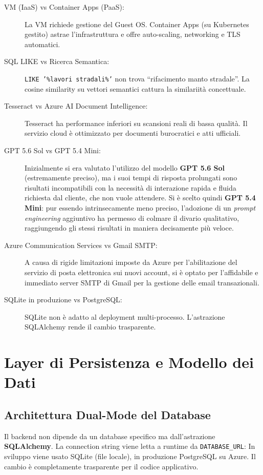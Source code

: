 \documentclass[12pt,a4paper,oneside]{report}
\begin{document}
\begin{description}
    \item[VM (IaaS) vs Container Apps (PaaS):] La VM richiede gestione del Guest OS.
        Container Apps (su Kubernetes gestito) astrae l'infrastruttura e offre
        auto-scaling, networking e TLS automatici.
    \item[SQL LIKE vs Ricerca Semantica:] \texttt{LIKE '\%lavori stradali\%'} non trova
        ``rifacimento manto stradale''. La cosine similarity su vettori semantici
        cattura la similariit\`{a} concettuale.
    \item[Tesseract vs Azure AI Document Intelligence:] Tesseract ha performance
        inferiori su scansioni reali di bassa qualit\`{a}. Il servizio cloud \`{e}
        ottimizzato per documenti burocratici e atti ufficiali.
    \item[GPT 5.6 Sol vs GPT 5.4 Mini:] Inizialmente si era valutato l'utilizzo del modello \textbf{GPT 5.6 Sol} (estremamente preciso), ma i suoi tempi di risposta prolungati sono risultati incompatibili con la necessit\`{a} di interazione rapida e fluida richiesta dal cliente, che non vuole attendere. Si \`{e} scelto quindi \textbf{GPT 5.4 Mini}: pur essendo intrinsecamente meno preciso, l'adozione di un \textit{prompt engineering} aggiuntivo ha permesso di colmare il divario qualitativo, raggiungendo gli stessi risultati in maniera decisamente pi\`{u} veloce.
    \item[Azure Communication Services vs Gmail SMTP:] A causa di rigide limitazioni imposte da Azure per l'abilitazione del servizio di posta elettronica sui nuovi account, si \`{e} optato per l'affidabile e immediato server SMTP di Gmail per la gestione delle email transazionali.
    \item[SQLite in produzione vs PostgreSQL:] SQLite non \`{e} adatto al deployment
        multi-processo. L'astrazione SQLAlchemy rende il cambio trasparente.
\end{description}

\chapter{Layer di Persistenza e Modello dei Dati}

\section{Architettura Dual-Mode del Database}

Il backend non dipende da un database specifico ma dall'astrazione\textbf{ SQLAlchemy}.
La connection string viene letta a runtime da \texttt{DATABASE\_URL}:
In sviluppo viene usato SQLite (file locale), in produzione PostgreSQL su Azure.
Il cambio \`{e} completamente trasparente per il codice applicativo.
\end{document}
